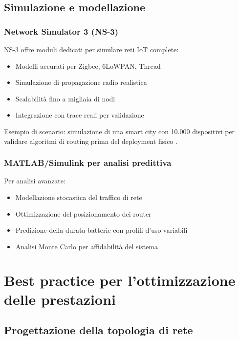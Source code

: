 \subsection{Simulazione e modellazione}

\subsubsection{Network Simulator 3 (NS-3)}

NS-3 offre moduli dedicati per simulare reti IoT complete:
\begin{itemize}
    \item Modelli accurati per Zigbee, 6LoWPAN, Thread
    \item Simulazione di propagazione radio realistica
    \item Scalabilità fino a migliaia di nodi
    \item Integrazione con trace reali per validazione
\end{itemize}

Esempio di scenario: simulazione di una smart city con 10.000 dispositivi per validare algoritmi di routing prima del deployment fisico \cite{NS3Simulator}.

\subsubsection{MATLAB/Simulink per analisi predittiva}

Per analisi avanzate:
\begin{itemize}
    \item Modellazione stocastica del traffico di rete
    \item Ottimizzazione del posizionamento dei router
    \item Predizione della durata batterie con profili d'uso variabili
    \item Analisi Monte Carlo per affidabilità del sistema
\end{itemize}

\section{Best practice per l'ottimizzazione delle prestazioni}

\subsection{Progettazione della topologia di rete}

